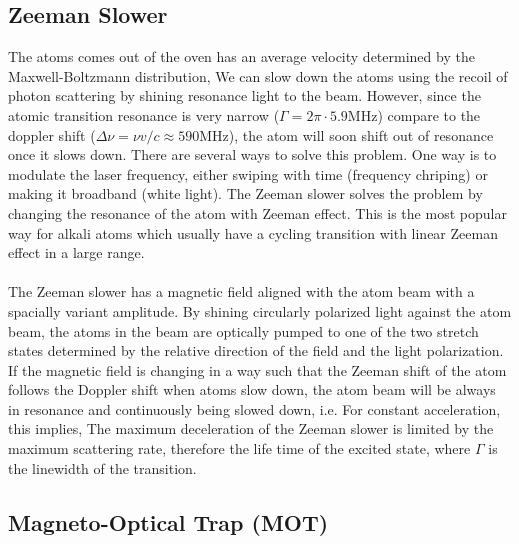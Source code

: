 \subsection{Zeeman Slower}\label{theory:zeeman}

The atoms comes out of the oven has an average velocity determined by the Maxwell-Boltzmann distribution,
We can slow down the atoms using the recoil of photon scattering by shining resonance light to the beam. However, since the atomic transition resonance is very narrow ($\Gamma=2\pi\cdot5.9\text{MHz}$) compare to the doppler shift ($\Delta\nu=\nu v/c\approx590\text{MHz}$), the atom will soon shift out of resonance once it slows down. There are several ways to solve this problem. One way is to modulate the laser frequency, either swiping with time (frequency chriping) or making it broadband (white light). The Zeeman slower solves the problem by changing the resonance of the atom with Zeeman effect. This is the most popular way for alkali atoms which usually have a cycling transition with linear Zeeman effect in a large range.\\
\\
The Zeeman slower has a magnetic field aligned with the atom beam with a spacially variant amplitude. By shining circularly polarized light against the atom beam, the atoms in the beam are optically pumped to one of the two stretch states determined by the relative direction of the field and the light polarization. If the magnetic field is changing in a way such that the Zeeman shift of the atom follows the Doppler shift when atoms slow down, the atom beam will be always in resonance and continuously being slowed down, i.e.
For constant acceleration, this implies,
The maximum deceleration of the Zeeman slower is limited by the maximum scattering rate, therefore the life time of the excited state,
where $\Gamma$ is the linewidth of the transition.

\subsection{Magneto-Optical Trap (MOT)}\label{theory:mot}

